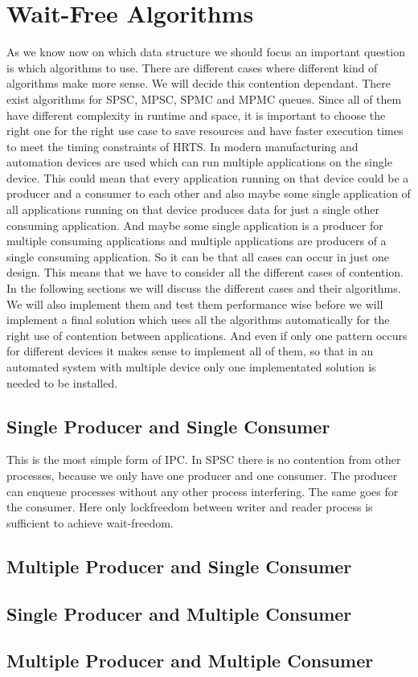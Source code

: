 \section{Wait-Free Algorithms}\label{sec:wait-free-alg}
As we know now on which data structure we should focus an important question is which algorithms to use. There are different cases where different kind of algorithms make more sense. We will decide this contention dependant. There exist algorithms for \ac{SPSC}, \ac{MPSC}, \ac{SPMC} and \ac{MPMC} queues. Since all of them have different complexity in runtime and space, it is important to choose the right one for the right use case to save resources and have faster execution times to meet the timing constraints of \ac{HRTS}. In modern manufacturing and automation devices are used which can run multiple applications on the single device. This could mean that every application running on that device could be a producer and a consumer to each other and also maybe some single application of all applications running on that device produces data for just a single other consuming application. And maybe some single application is a producer for multiple consuming applications and multiple applications are producers of a single consuming application. So it can be that all cases can occur in just one design. This means that we have to consider all the different cases of contention. In the following sections we will discuss the different cases and their algorithms. We will also implement them and test them performance wise before we will implement a final solution which uses all the algorithms automatically for the right use of contention between applications. And even if only one pattern occurs for different devices it makes sense to implement all of them, so that in an automated system with multiple device only one implementated solution is needed to be installed.

\subsection{Single Producer and Single Consumer}\label{sec:single-producer-and-single-consumer}
This is the most simple form of \ac{IPC}. In \ac{SPSC} there is no contention from other processes, because we only have one producer and one consumer. The producer can enqueue processes without any other process interfering. The same goes for the consumer. Here only lockfreedom between writer and reader process is sufficient to achieve wait-freedom.

\subsection{Multiple Producer and Single Consumer}\label{sec:multiple-producer-and-single-consumer}

\subsection{Single Producer and Multiple Consumer}\label{sec:single-producer-and-multiple-consumer}

\subsection{Multiple Producer and Multiple Consumer}\label{sec:multiple-producer-and-multiple-consumer}